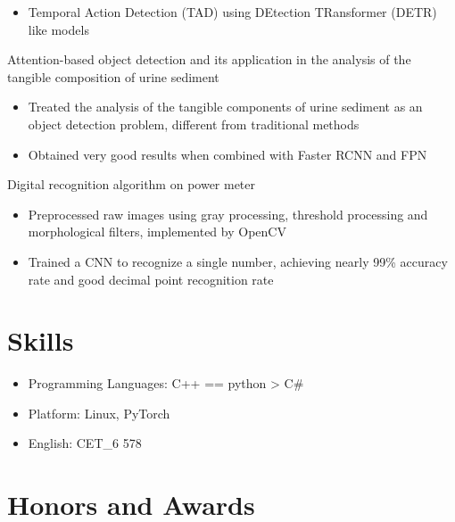 \documentclass{resume}
\begin{document}
\begin{itemize}
  \item Temporal Action Detection (TAD) using DEtection TRansformer (DETR) like models
\end{itemize}

Attention-based object detection and its application in the analysis of the tangible composition of urine sediment
\begin{itemize}
  \item Treated the analysis of the tangible components of urine sediment as an object detection problem, different from traditional methods
  \item Obtained very good results when combined with Faster RCNN and FPN
\end{itemize}

Digital recognition algorithm on power meter
\begin{itemize}
  \item Preprocessed raw images using gray processing, threshold processing and morphological filters, implemented by OpenCV
  \item Trained a CNN to recognize a single number, achieving nearly 99\% accuracy rate and good decimal point recognition rate
\end{itemize}


\section{Skills}
\begin{itemize}[parsep=0.5ex]
  \item Programming Languages: C++ == python > C\#
  \item Platform: Linux, PyTorch
  \item English: CET\_6 578
\end{itemize}

\section{Honors and Awards}

%
%
\end{document}
